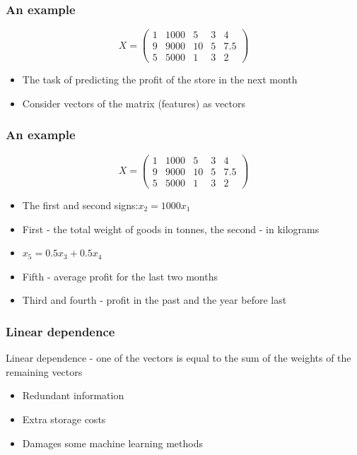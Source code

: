 \documentclass[default]{beamer}
\begin{document}
	\begin{frame}	
		\frametitle{An example}
		
		\Large
		\[
			X = \begin{pmatrix}
				1 & 1000 & 5 & 3 & 4 \\
				9 & 9000 & 10 & 5 & 7.5 \\
				5 & 5000 & 1 & 3 & 2
			\end{pmatrix}
		\]
		\begin{itemize}
			\item The task of predicting the profit of the store in the next month
			\item Consider vectors of the matrix (features) as vectors
		\end{itemize}
		
	\end{frame}

	\begin{frame}	
		\frametitle{An example}
		
		\Large
		\[
		X = \begin{pmatrix}
		1 & 1000 & 5 & 3 & 4 \\
		9 & 9000 & 10 & 5 & 7.5 \\
		5 & 5000 & 1 & 3 & 2
		\end{pmatrix}
		\]
		\begin{itemize}
			\item The first and second signs:$x_2 = 1000x_1$
			\item First - the total weight of goods in tonnes, the second - in kilograms
			\item $x_5=0.5x_3+0.5x_4$
			\item Fifth - average profit for the last two months
			\item Third and fourth - profit in the past and the year before last
		\end{itemize}
		
	\end{frame}

	\begin{frame}	
		\frametitle{Linear dependence}
		
		\Large
		Linear dependence - one of the vectors is equal to the sum of the weights of the remaining vectors
		\begin{itemize}
			\item Redundant information
			\item Extra storage costs
			\item Damages some machine learning methods
		\end{itemize}
		
	\end{frame}
\end{document}

